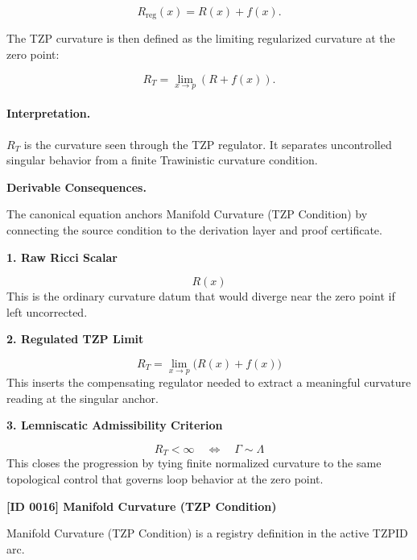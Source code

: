 \begin{equation}
R_{\mathrm{reg}}(x)=R(x)+f(x).
\end{equation}

The TZP curvature is then defined as the limiting regularized curvature at the zero point:

\begin{equation}
\boxed{
R_T
=
\lim_{x\to p}
\left(
R+f(x)
\right).
}
\end{equation}

\paragraph{Interpretation.}
$R_T$ is the curvature seen through the TZP regulator. It separates uncontrolled singular behavior from a finite Trawinistic curvature condition.

\par\vspace{0.35em}
\noindent\textbf{Derivable Consequences.}\quad
\begingroup
\footnotesize
\raggedright
The canonical equation anchors Manifold Curvature (TZP Condition) by connecting the source condition to the derivation layer and proof certificate.
\par\endgroup

\noindent\textbf{1. Raw Ricci Scalar}\par
\[
R(x)
\]
\noindent This is the ordinary curvature datum that would diverge near the zero point if left uncorrected.\par
\noindent\textbf{2. Regulated TZP Limit}\par
\[
R_{T}
=
\lim_{x \to p}\bigl(R(x)+f(x)\bigr)
\]
\noindent This inserts the compensating regulator needed to extract a meaningful curvature reading at the singular anchor.\par
\noindent\textbf{3. Lemniscatic Admissibility Criterion}\par
\[
R_{T} < \infty
\quad \Longleftrightarrow \quad
\Gamma \sim \Lambda
\]
\noindent This closes the progression by tying finite normalized curvature to the same topological control that governs loop behavior at the zero point.\par

\clearpage
\noindent\textbf{[ID 0016] Manifold Curvature (TZP Condition)}\par
\vspace{0.35em}
\begingroup\small
{}
Manifold Curvature (TZP Condition) is a registry definition in the active TZPID arc.

